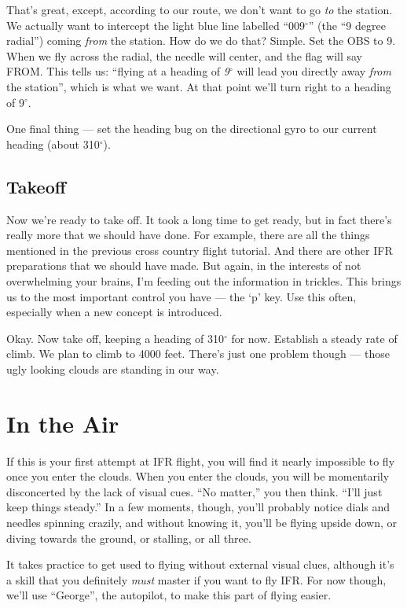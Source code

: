 That's great, except, according to our route, we don't want to go
\emph{to} the station.  We actually want to intercept the light blue
line labelled ``009$^\circ$'' (the ``9 degree radial'') coming
\emph{from} the station.  How do we do that?  Simple.  Set the OBS to
9.  When we fly across the radial, the needle will center, and the
flag will say FROM.  This tells us: ``flying at a heading of
\emph{9$^\circ$} will lead you directly away \emph{from} the
station'', which is what we want.  At that point we'll turn right to a
heading of 9$^\circ$.

One final thing --- set the heading bug on the directional gyro to our
current heading (about 310$^\circ$).

\subsection{Takeoff}

Now we're ready to take off.  It took a long time to get ready, but in
fact there's really more that we should have done.  For example, there
are all the things mentioned in the previous cross country flight
tutorial.  And there are other IFR preparations that we should have
made.  But again, in the interests of not overwhelming your brains,
I'm feeding out the information in trickles.  This brings us to the
most important control you have --- the `p' key.  Use this often,
especially when a new concept is introduced.

Okay.  Now take off, keeping a heading of 310$^\circ$ for now.  Establish a
steady rate of climb.  We plan to climb to 4000 feet.  There's just
one problem though --- those ugly looking clouds are standing in our
way.

\section{In the Air}

If this is your first attempt at IFR flight, you will find it nearly
impossible to fly once you enter the clouds.  When you enter the
clouds, you will be momentarily disconcerted by the lack of visual
cues.  ``No matter,'' you then think.  ``I'll just keep things
steady.''  In a few moments, though, you'll probably notice dials and
needles spinning crazily, and without knowing it, you'll be flying
upside down, or diving towards the ground, or stalling, or all three.

It takes practice to get used to flying without external visual clues,
although it's a skill that you definitely \emph{must} master if you
want to fly IFR.  For now though, we'll use ``George'', the autopilot,
to make this part of flying easier.

